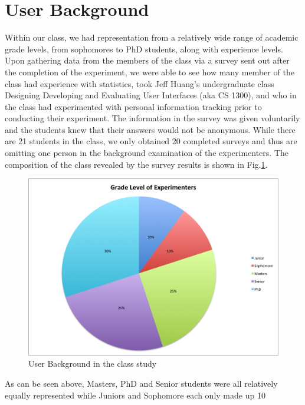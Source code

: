 \section{User Background}
Within our class, we had representation from a relatively wide range of academic grade levels, from sophomores to PhD students, along with experience levels.  Upon gathering data from the members of the class via a survey sent out after the completion of the experiment, we were able to see how many member of the class had experience with statistics, took Jeff Huang’s undergraduate class Designing Developing and Evaluating User Interfaces (aka CS 1300), and who in the class had experimented with personal information tracking prior to conducting their experiment.  The information in the survey was given voluntarily and the students knew that their answers would not be anonymous.  While there are 21 students in the class, we only obtained 20 completed surveys and thus are omitting one person in the background examination of the experimenters. The composition of the class revealed by the survey results is shown in Fig.\ref{fig:surveybc}.  

\begin{figure}[!t]\centering
\includegraphics[width=1.0\columnwidth]{images/Grade_Level_of_Experimenters.png}
\caption{\footnotesize User Background in the class study \label{fig:surveybc} 
}%
\end{figure}

As can be seen above,  Masters, PhD and Senior students were all relatively equally represented while Juniors and Sophomore each only made up 10%

